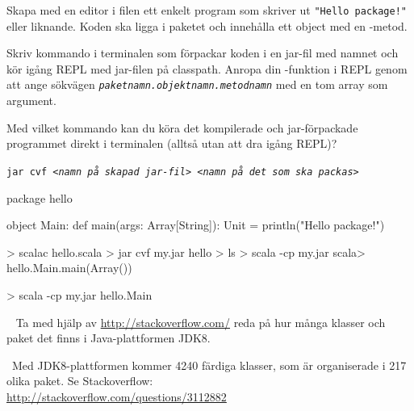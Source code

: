 \Subtask Skapa med en editor i filen  ett enkelt program som skriver ut \texttt{"Hello package!"} eller liknande. Koden ska ligga i paketet  och innehålla ett object  med en -metod.

\Subtask Skriv kommando i terminalen som förpackar koden i en jar-fil med namnet  och kör igång REPL med jar-filen på classpath. Anropa din -funktion i REPL genom att ange sökvägen \textit{\texttt{paketnamn.objektnamn.metodnamn}} med en tom array som argument.

\Subtask Med vilket kommando kan du köra det kompilerade och jar-förpackade programmet direkt i terminalen (alltså utan att dra igång REPL)?

\SOLUTION

\TaskSolved \what

\SubtaskSolved

\texttt{jar cvf \textit{<namn på skapad jar-fil> <namn på det som ska packas>}}

\SubtaskSolved
\begin{Code}
package hello

object Main:
  def main(args: Array[String]): Unit = println("Hello package!")
\end{Code}

\SubtaskSolved
\begin{REPL}
> scalac hello.scala
> jar cvf my.jar hello
> ls
> scala -cp my.jar
scala> hello.Main.main(Array())
\end{REPL}

\SubtaskSolved
\begin{REPL}
> scala -cp my.jar hello.Main
\end{REPL}

\QUESTEND





\QUESTBEGIN

\Task\Uberkurs \what~ Ta med hjälp av \url{http://stackoverflow.com/} reda på hur många klasser och paket det finns i Java-plattformen JDK8.

\SOLUTION

\TaskSolved \what~Med JDK8-plattformen kommer 4240 färdiga klasser, som är organiserade i 217 olika paket. Se Stackoverflow: \\\url{http://stackoverflow.com/questions/3112882}

\QUESTEND
